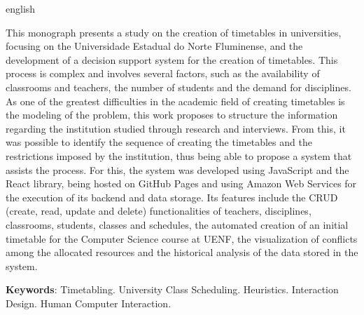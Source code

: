 \begin{resumo}[Abstract]
  \begin{otherlanguage*}{english}

    This monograph presents a study on the creation of timetables in universities, focusing on the Universidade Estadual do Norte Fluminense, and the development of a decision support system for the creation of timetables. This process is complex and involves several factors, such as the availability of classrooms and teachers, the number of students and the demand for disciplines. As one of the greatest difficulties in the academic field of creating timetables is the modeling of the problem, this work proposes to structure the information regarding the institution studied through research and interviews. From this, it was possible to identify the sequence of creating the timetables and the restrictions imposed by the institution, thus being able to propose a system that assists the process. For this, the system was developed using JavaScript and the React library, being hosted on GitHub Pages and using Amazon Web Services for the execution of its backend and data storage. Its features include the CRUD (create, read, update and delete) functionalities of teachers, disciplines, classrooms, students, classes and schedules, the automated creation of an initial timetable for the Computer Science course at UENF, the visualization of conflicts among the allocated resources and the historical analysis of the data stored in the system.

    \textbf{Keywords}: Timetabling. University Class Scheduling. Heuristics. Interaction Design. Human Computer Interaction.

  \end{otherlanguage*}


\end{resumo}